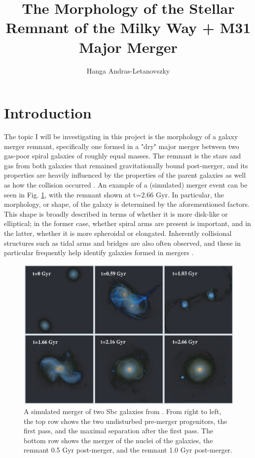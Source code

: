\documentclass[linenumbers]{aastex631}
\begin{document}
\title{The Morphology of the Stellar Remnant of the Milky Way + M31 Major Merger}


\author{Hanga Andras-Letanovszky}


\section{Introduction}

The topic I will be investigating in this project is the morphology of a galaxy merger remnant, specifically one formed in a "dry" major merger between two gas-poor spiral galaxies of roughly equal masses. 
The remnant is the stars and gas from both galaxies that remained gravitationally bound post-merger, and its properties are heavily influenced by the properties of the parent galaxies as well as how the collision occurred \citep{Barnes+1992}. 
An example of a (simulated) merger event can be seen in Fig. \ref{fig:merger}, with the remnant shown at t=2.66 Gyr.
In particular, the morphology, or shape, of the galaxy is determined by the aforementioned factors.
This shape is broadly described in terms of whether it is more disk-like or elliptical; in the former case, whether spiral arms are present is important, and in the latter, whether it is more spheroidal or elongated.
Inherently collisional structures such as tidal arms and bridges are also often observed, and these in particular frequently help identify galaxies formed in mergers \citep{Duc2013}.
\begin{figure}[h!]
    \centering
    \centering
    \includegraphics[width=0.5\linewidth]{merger.png}
    \caption{
        A simulated merger of two Sbc galaxies from \cite{Lotz+2008}.
        From right to left, the top row shows the two undisturbed pre-merger progenitors, the first pass, and the maximal separation after the first pass.
        The bottom row shows the merger of the nuclei of the galaxies, the remnant 0.5 Gyr post-merger, and the remnant 1.0 Gyr post-merger.
        }
    \label{fig:merger}
\end{figure}
\end{document}
